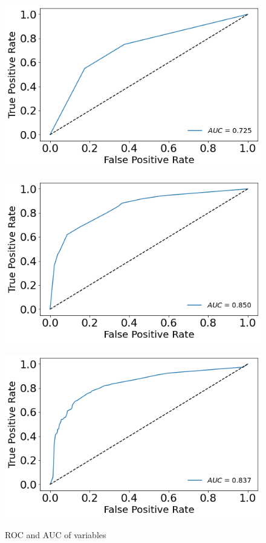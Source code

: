 \documentclass[a4paper,11pt,dvipsnames]{article}
\begin{document}
\begin{figure}[h]
\begin{minipage}[b]{.3\linewidth}
\centering\includegraphics[width=0.8\linewidth]{polysemy_ROC.png}\label{fig:polroc}
\end{minipage}    \hfil
\begin{minipage}[b]{.3\linewidth}
\centering\large \includegraphics[width=0.8\linewidth]{aoabinary_ROC.png}
\label{fig:aoabinroc}
\end{minipage}    \hfil
\begin{minipage}[b]{.3\linewidth}
\centering\includegraphics[width=0.8\linewidth]{perceivability_ROC.png}\label{fig:perroc}
\end{minipage}


\caption{ROC and AUC of variables}\label{fig:roc}

\end{figure}
\end{document}
